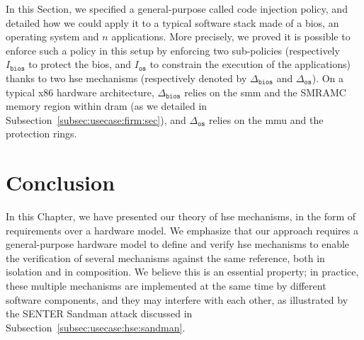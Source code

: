 In this Section, we specified a general-purpose called code injection policy,
and detailed how we could apply it to a typical software stack made of a
\ac{bios}, an operating system and \( n \) applications.
%
More precisely, we proved it is possible to enforce such a policy in this setup
by enforcing two sub-policies (respectively \( I_{\mathtt{bios}} \) to protect
the \ac{bios}, and \( I_{\mathtt{os}} \) to constrain the execution of the
applications) thanks to two \ac{hse} mechanisms (respectively denoted by
\( \Delta_{\mathtt{bios}} \) and \( \Delta_{\mathtt{os}} \)).
%
On a typical x86 hardware architecture, \( \Delta_{\mathtt{bios}} \) relies on
the \ac{smm} and the SMRAMC memory region within \ac{dram} (as we detailed in
Subsection~\ref{subsec:usecase:firm:sec}), and \( \Delta_{\mathtt{os}} \) relies
on the \ac{mmu} and the protection rings.

\section{Conclusion}

In this Chapter, we have presented our theory of \ac{hse} mechanisms, in the
form of requirements over a hardware model.
%
We emphasize that our approach requires a general-purpose hardware model to
define and verify \ac{hse} mechanisms to enable the verification of several
mechanisms against the same reference, both in isolation and in composition. 
%
We believe this is an essential property; in practice, these multiple mechanisms
are implemented at the same time by different software components, and they may
interfere with each other, as illustrated by the SENTER Sandman attack discussed
in Subsection~\ref{subsec:usecase:hse:sandman}.


